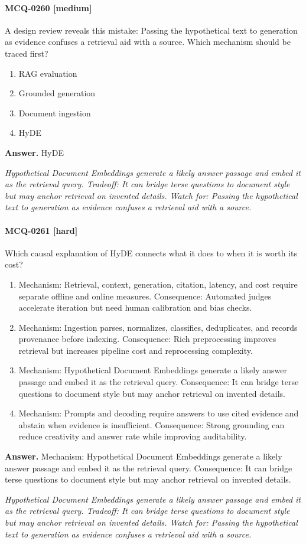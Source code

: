 \paragraph{MCQ-0260 [medium]} A design review reveals this mistake: Passing the hypothetical text to generation as evidence confuses a retrieval aid with a source. Which mechanism should be traced first?
\begin{enumerate}[label=\Alph*.]
\item RAG evaluation
\item Grounded generation
\item Document ingestion
\item HyDE
\end{enumerate}
\noindent\textbf{Answer.} HyDE
\par\textit{Hypothetical Document Embeddings generate a likely answer passage and embed it as the retrieval query. Tradeoff: It can bridge terse questions to document style but may anchor retrieval on invented details. Watch for: Passing the hypothetical text to generation as evidence confuses a retrieval aid with a source.}
\paragraph{MCQ-0261 [hard]} Which causal explanation of HyDE connects what it does to when it is worth its cost?
\begin{enumerate}[label=\Alph*.]
\item Mechanism: Retrieval, context, generation, citation, latency, and cost require separate offline and online measures. Consequence: Automated judges accelerate iteration but need human calibration and bias checks.
\item Mechanism: Ingestion parses, normalizes, classifies, deduplicates, and records provenance before indexing. Consequence: Rich preprocessing improves retrieval but increases pipeline cost and reprocessing complexity.
\item Mechanism: Hypothetical Document Embeddings generate a likely answer passage and embed it as the retrieval query. Consequence: It can bridge terse questions to document style but may anchor retrieval on invented details.
\item Mechanism: Prompts and decoding require answers to use cited evidence and abstain when evidence is insufficient. Consequence: Strong grounding can reduce creativity and answer rate while improving auditability.
\end{enumerate}
\noindent\textbf{Answer.} Mechanism: Hypothetical Document Embeddings generate a likely answer passage and embed it as the retrieval query. Consequence: It can bridge terse questions to document style but may anchor retrieval on invented details.
\par\textit{Hypothetical Document Embeddings generate a likely answer passage and embed it as the retrieval query. Tradeoff: It can bridge terse questions to document style but may anchor retrieval on invented details. Watch for: Passing the hypothetical text to generation as evidence confuses a retrieval aid with a source.}
